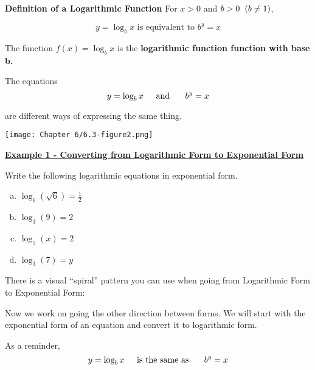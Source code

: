 \documentclass[12pt]{book}
\newcommand{\D}{\displaystyle}
\begin{document}
\begin{boxR}
    \textbf{Definition of a Logarithmic Function}
    \vspace{1mm}
    \hline
    \vspace{2mm}
    For $x>0$ and $b>0 \hspace{2mm} (b \neq1)$, 

    $$y=\log_bx \text{ is equivalent to } b^y=x$$

    The function $f(x)=\log_bx$ is the \textbf{logarithmic function function with base b.}
\end{boxR}


\vspace{10mm}
The equations $$ y=\log_bx \text{\hspace{4mm} and \hspace{4mm} } b^y=x $$ 

are different ways of expressing the same thing.
\newpage

\centerline{\texttt{[image: Chapter 6/6.3-figure2.png]}}
\vspace{5mm}

\underline{\textbf{Example 1 - Converting from Logarithmic Form to Exponential Form}}

Write the following logarithmic equations in exponential form.
\vspace{2mm}
\begin{enumerate}[(a)]
    \item $\D \log_6 (\sqrt{6})=\frac{1}{2}$
    \vspace{25mm}
    \item $\D \log_3 (9)=2$
    \vspace{25mm}
    \item $\D \log_5(x)=2$
    \vspace{25mm}
    \item $\D \log_3(7)=y$
    \vspace{25mm}    
\end{enumerate}

There is a visual ``spiral'' pattern you can use when going from Logarithmic Form to Exponential Form:



\newpage
Now we work on going the other direction between forms. We will start with the exponential form of an equation and convert it to logarithmic form. 

As a reminder,  $$ y=\log_bx \text{\hspace{4mm} is the same as \hspace{4mm} } b^y=x $$ 
\end{document}
